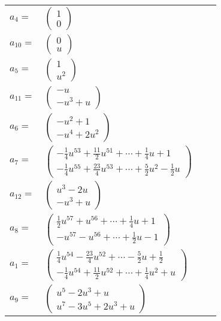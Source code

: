 \documentclass[1p]{elsarticle_modified}
\theoremstyle{definition}
\begin{document}
\begin{tabular}{m{7pt} m{180pt} m{7pt} m{180pt} }
\flushright $a_{4}=$&$\begin{pmatrix}1\\0\end{pmatrix}$ \\
\flushright $a_{10}=$&$\begin{pmatrix}0\\u\end{pmatrix}$ \\
\flushright $a_{5}=$&$\begin{pmatrix}1\\u^2\end{pmatrix}$ \\
\flushright $a_{11}=$&$\begin{pmatrix}- u\\- u^3+u\end{pmatrix}$ \\
\flushright $a_{6}=$&$\begin{pmatrix}- u^2+1\\- u^4+2 u^2\end{pmatrix}$ \\
\flushright $a_{7}=$&$\begin{pmatrix}-\frac{1}{4} u^{53}+\frac{11}{2} u^{51}+\cdots+\frac{1}{4} u+1\\-\frac{1}{4} u^{55}+\frac{23}{4} u^{53}+\cdots+\frac{5}{2} u^2-\frac{1}{2} u\end{pmatrix}$ \\
\flushright $a_{12}=$&$\begin{pmatrix}u^3-2 u\\- u^3+u\end{pmatrix}$ \\
\flushright $a_{8}=$&$\begin{pmatrix}\frac{1}{2} u^{57}+u^{56}+\cdots+\frac{1}{4} u+1\\- u^{57}- u^{56}+\cdots+\frac{1}{2} u-1\end{pmatrix}$ \\
\flushright $a_{1}=$&$\begin{pmatrix}\frac{1}{4} u^{54}-\frac{23}{4} u^{52}+\cdots-\frac{5}{2} u+\frac{1}{2}\\-\frac{1}{4} u^{54}+\frac{11}{2} u^{52}+\cdots+\frac{1}{4} u^2+u\end{pmatrix}$ \\
\flushright $a_{9}=$&$\begin{pmatrix}u^5-2 u^3+u\\u^7-3 u^5+2 u^3+u\end{pmatrix}$ \\

\end{tabular}
\end{document}

